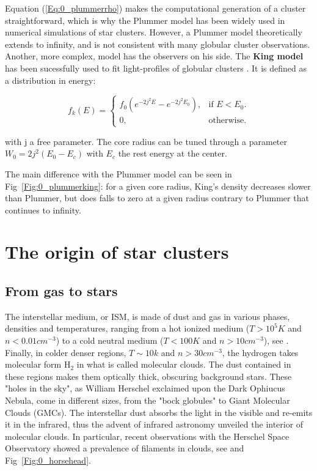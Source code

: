 Equation (\ref{Eq:0_plummerrho}) makes the computational generation of a cluster straightforward, which is why the Plummer model has been widely used in numerical simulations of star clusters.
However, a Plummer model theoretically extends to infinity, and is not consistent with many globular cluster observations. Another, more complex, model has the observers on his side. The \textbf{King model} has been sucessfully used to fit light-profiles of globular clusters \citep{King1981}. It is defined as a distribution in energy:

\begin{equation}
  f_k(E)=\begin{cases}
    f_0 \left(e^{-2j^2E} - e^{-2j^2E_0}\right)  , & \text{if $E<E_0$}.\\
    0, & \text{otherwise}.
  \end{cases}
\end{equation}

with j a free parameter. The core radius can be tuned through a parameter $W_0 =2j^2(E_0 - E_c)$ with $E_c$ the rest energy at the center. 

The main difference with the Plummer model can be seen in Fig~\ref{Fig:0_plummerking}: for a given core radius, King's density decreases slower than Plummer, but does falls to zero at a given radius contrary to Plummer that continues to infinity.






\section{The origin of star clusters}

\subsection{From gas to stars}

The interstellar medium, or ISM, is made of dust and gas in various phases, densities and temperatures, ranging from a hot ionized medium ($T>10^5 K$ and $n < 0.01 cm^{-3}$) to a cold neutral medium ($T<100 K$ and $n > 10 cm^{-3}$),  see \cite{Field1969}. Finally, in colder denser regions, $T\sim 10k$ and $n>30cm^{-3}$, the hydrogen takes molecular form H$_2$ in what is called molecular clouds. The dust contained in these regions makes them optically thick, obscuring background stars. These "holes in the sky", as William Herschel exclaimed upon the Dark Ophiucus Nebula\citep{Houghton1942}, come in different sizes, from the "bock globules" to Giant Molecular Clouds (GMCs).
The interstellar dust absorbs the light in the visible and re-emits it in the infrared, thus the advent of infrared astronomy unveiled the interior of molecular clouds. In particular, recent observations with the Herschel Space Observatory showed a prevalence of filaments in clouds, see \cite{Andre2010} and Fig~\ref{Fig:0_horsehead}.

